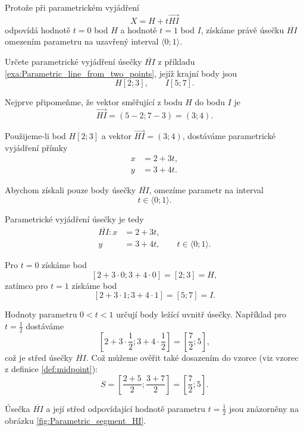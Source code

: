 Protože při parametrickém vyjádření
\[
    X=H+t\overrightarrow{HI}
\]
odpovídá hodnotě $t=0$ bod $H$ a hodnotě $t=1$ bod $I$, získáme právě
úsečku $\overline{HI}$ omezením parametru na uzavřený interval
$\langle0;1\rangle$.

\begin{example}\label{exa:Parametric_segment_between_two_points}
    Určete parametrické vyjádření úsečky $\overline{HI}$ z příkladu
    \ref{exa:Parametric_line_from_two_points}, jejíž krajní body jsou
    \[
        H[2;3],\qquad I[5;7].
    \]

    Nejprve připomeňme, že vektor směřující z bodu $H$ do bodu $I$ je
    \[
        \overrightarrow{HI}
        =(5-2;7-3)
        =(3;4).
    \]

    Použijeme-li bod $H[2;3]$ a vektor $\overrightarrow{HI}=(3;4)$,
    dostáváme parametrické vyjádření přímky
    \begin{align*}
        x &= 2+3t,\\
        y &= 3+4t.
    \end{align*}

    Abychom získali pouze body úsečky $\overline{HI}$, omezíme parametr
    na interval
    \[
        t\in\langle0;1\rangle.
    \]

    Parametrické vyjádření úsečky je tedy
    \begin{align*}
        \overline{HI}: x &= 2+3t,\\
                         y &= 3+4t,
                         \qquad t\in\langle0;1\rangle.
    \end{align*}

    Pro $t=0$ získáme bod
    \[
        [2+3\cdot0;3+4\cdot0]=[2;3]=H,
    \]
    zatímco pro $t=1$ získáme bod
    \[
        [2+3\cdot1;3+4\cdot1]=[5;7]=I.
    \]

    Hodnoty parametru $0<t<1$ určují body ležící uvnitř úsečky.
    Například pro $t=\frac12$ dostáváme
    \[
        \left[
            2+3\cdot\frac12;
            3+4\cdot\frac12
        \right]
        =
        \left[
            \frac72;5
        \right],
    \]
    což je střed úsečky $\overline{HI}$. Což můžeme ověřit také dosazením do vzorce (viz vzorec z definice \ref{def:midpoint}):
    \[
        S=\left[
            \frac{2+5}{2};
            \frac{3+7}{2}
        \right]
        =
        \left[
            \frac72;5
        \right].
    \]

    Úsečka $\overline{HI}$ a její střed odpovídající hodnotě parametru $t=\frac12$ jsou znázorněny na obrázku \ref{fig:Parametric_segment_HI}.
\end{example}

